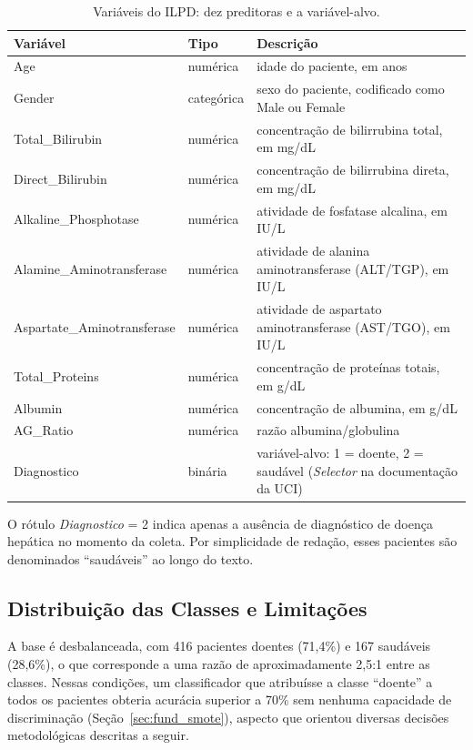 \begin{table}[htbp]
\centering
\begin{tabular}{llp{8cm}}
\hline
\textbf{Variável} & \textbf{Tipo} & \textbf{Descrição} \\
\hline
Age                         & numérica    & idade do paciente, em anos \\
Gender                      & categórica  & sexo do paciente, codificado como Male ou Female \\
Total\_Bilirubin            & numérica    & concentração de bilirrubina total, em mg/dL \\
Direct\_Bilirubin           & numérica    & concentração de bilirrubina direta, em mg/dL \\
Alkaline\_Phosphotase       & numérica    & atividade de fosfatase alcalina, em IU/L \\
Alamine\_Aminotransferase   & numérica    & atividade de alanina aminotransferase (ALT/TGP), em IU/L \\
Aspartate\_Aminotransferase & numérica    & atividade de aspartato aminotransferase (AST/TGO), em IU/L \\
Total\_Proteins             & numérica    & concentração de proteínas totais, em g/dL \\
Albumin                     & numérica    & concentração de albumina, em g/dL \\
AG\_Ratio                   & numérica    & razão albumina/globulina \\
Diagnostico                 & binária     & variável-alvo: 1 = doente, 2 = saudável (\textit{Selector} na documentação da UCI) \\
\hline
\end{tabular}
\caption{Variáveis do ILPD: dez preditoras e a variável-alvo.}
\label{tab:variaveis}
\end{table}

O rótulo \textit{Diagnostico} = 2 indica apenas a ausência de diagnóstico de doença hepática no momento da coleta. Por simplicidade de redação, esses pacientes são denominados ``saudáveis'' ao longo do texto.

\subsection{Distribuição das Classes e Limitações}
\label{sec:distribuicao_classes}

A base é desbalanceada, com 416 pacientes doentes (71,4\%) e 167 saudáveis (28,6\%), o que corresponde a uma razão de aproximadamente 2,5:1 entre as classes. Nessas condições, um classificador que atribuísse a classe ``doente'' a todos os pacientes obteria acurácia superior a 70\% sem nenhuma capacidade de discriminação (Seção~\ref{sec:fund_smote}), aspecto que orientou diversas decisões metodológicas descritas a seguir.

